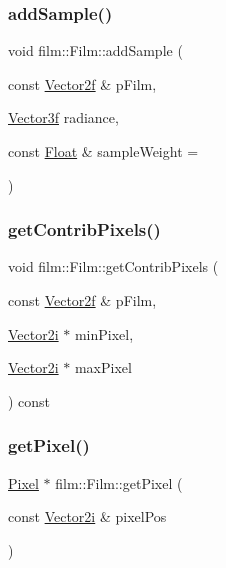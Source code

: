 \subsubsection{\texorpdfstring{addSample()}{addSample()}}
{\footnotesize\ttfamily void film\+::\+Film\+::add\+Sample (\begin{DoxyParamCaption}\item[{const \mbox{\hyperlink{cyclop_8hpp_a0c5eff6545fe0b71d0592c88d930b697}{Vector2f}} \&}]{p\+Film,  }\item[{\mbox{\hyperlink{cyclop_8hpp_a5a0a2e85b081623ef3f7e7e8d43024f5}{Vector3f}}}]{radiance,  }\item[{const \mbox{\hyperlink{cyclop_8hpp_a07afd7094cb489cbd514c76e6f55d34f}{Float}} \&}]{sample\+Weight = {} }\end{DoxyParamCaption})}

\mbox{\label{classfilm_1_1Film_a9d9e52c6fa8912d0e448dd64ffeba7de}} 
\subsubsection{\texorpdfstring{getContribPixels()}{getContribPixels()}}
{\footnotesize\ttfamily void film\+::\+Film\+::get\+Contrib\+Pixels (\begin{DoxyParamCaption}\item[{const \mbox{\hyperlink{cyclop_8hpp_a0c5eff6545fe0b71d0592c88d930b697}{Vector2f}} \&}]{p\+Film,  }\item[{\mbox{\hyperlink{cyclop_8hpp_ac9c6c66d543f1c0c5bc66579727dae30}{Vector2i}} $\ast$}]{min\+Pixel,  }\item[{\mbox{\hyperlink{cyclop_8hpp_ac9c6c66d543f1c0c5bc66579727dae30}{Vector2i}} $\ast$}]{max\+Pixel }\end{DoxyParamCaption}) const}

\mbox{\label{classfilm_1_1Film_a8f34b6e92180a01c4117ba79baa319be}} 
\subsubsection{\texorpdfstring{getPixel()}{getPixel()}}
{\footnotesize\ttfamily \mbox{\hyperlink{structfilm_1_1Pixel}{Pixel}} $\ast$ film\+::\+Film\+::get\+Pixel (\begin{DoxyParamCaption}\item[{const \mbox{\hyperlink{cyclop_8hpp_ac9c6c66d543f1c0c5bc66579727dae30}{Vector2i}} \&}]{pixel\+Pos }\end{DoxyParamCaption})}

